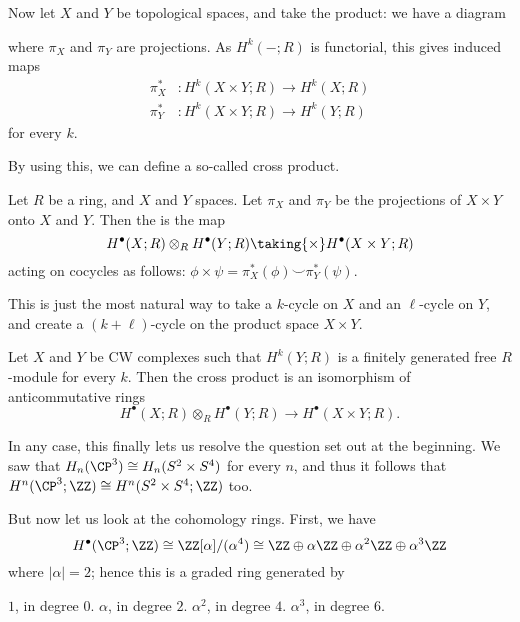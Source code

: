 Now let $X$ and $Y$ be topological spaces, and take the product:
we have a diagram
\begin{center}
\end{center}
where $\pi_X$ and $\pi_Y$ are projections.
As $H^k(-; R)$ is functorial, this gives induced maps
\begin{align*}
	\pi_X^\ast &: H^k(X \times Y; R) \to H^k(X; R) \\
	\pi_Y^\ast &: H^k(X \times Y; R) \to H^k(Y; R)
\end{align*}
for every $k$.

By using this, we can define a so-called cross product.
\begin{definition}
	Let $R$ be a ring, and $X$ and $Y$ spaces.
	Let $\pi_X$ and $\pi_Y$ be the projections of $X \times Y$
	onto $X$ and $Y$.
	Then the  is the map
	\[
		H^\bullet(X; R) \otimes_R H^\bullet(Y;R)
		\taking{\times} H^\bullet(X \times Y; R)
	\]
	acting on cocycles as follows:
	$\phi \times \psi = \pi_X^\ast(\phi) \smile \pi_Y^\ast(\psi)$.
\end{definition}

This is just the most natural way to take a $k$-cycle
on $X$ and an $\ell$-cycle on $Y$, and create a $(k+\ell)$-cycle
on the product space $X \times Y$.


\begin{theorem}
	Let $X$ and $Y$ be CW complexes such that $H^k(Y;R)$
	is a finitely generated free $R$-module for every $k$.
	Then the cross product is an isomorphism of anticommutative rings
	\[
		H^\bullet(X;R) \otimes_R H^\bullet(Y;R)
		\to H^\bullet(X \times Y; R).
	\]
\end{theorem}

In any case, this finally lets us resolve the question
set out at the beginning.
We saw that $H_n(\CP^3) \cong H_n(S^2 \times S^4)$ for every $n$,
and thus it follows that $H^n(\CP^3; \ZZ) \cong H^n(S^2 \times S^4; \ZZ)$ too.

But now let us look at the cohomology rings. First, we have
\[ H^\bullet(\CP^3; \ZZ) \cong \ZZ[\alpha] / (\alpha^4)
	\cong \ZZ \oplus \alpha\ZZ \oplus \alpha^2\ZZ \oplus \alpha^3\ZZ
\]
where $|\alpha| = 2$; hence this is a graded ring generated by
\begin{itemize}
	\ii $1$, in degree $0$.
	\ii $\alpha$, in degree $2$.
	\ii $\alpha^2$, in degree $4$.
	\ii $\alpha^3$, in degree $6$.
\end{itemize}

